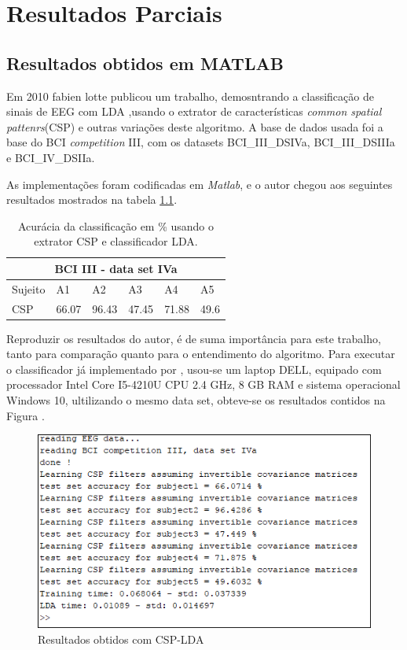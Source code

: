 \chapter[Resultados Parcias ]{Resultados Parciais}

\section{Resultados obtidos em MATLAB}
Em 2010 fabien lotte publicou um trabalho, demosntrando a classificação de sinais de EEG com LDA \cite{F.Lotte},usando o extrator de características \textit{common spatial pattenrs}(CSP) e outras
variações deste algoritmo. A base de dados usada foi a base do BCI \textit{competition} III, com os datasets BCI\_III\_DSIVa, BCI\_III\_DSIIIa e BCI\_IV\_DSIIa. 

As implementações foram codificadas em \textit{Matlab}, e o autor chegou aos seguintes resultados mostrados na tabela \ref{resultlotte}.

\begin{table}[h]
\centering
\caption{Acurácia da classificação em \% usando o extrator CSP e classificador LDA.}
\label{resultlotte}
\begin{tabular}{|l|l|l|l|l|l|}
\hline
\multicolumn{6}{|c|}{BCI III -  data set IVa}  \\ \hline
Sujeito & A1    & A2    & A3    & A4    & A5   \\ \hline
CSP     & 66.07 & 96.43 & 47.45 & 71.88 & 49.6 \\ \hline
\end{tabular}
\end{table}
 
Reproduzir os resultados do autor, é de suma importância para este trabalho, tanto para comparação quanto para o entendimento do algoritmo. Para executar o classificador já implementado por \cite{F.Lotte}, usou-se um laptop DELL, equipado com processador Intel Core I5-4210U CPU 2.4 GHz, 8 GB RAM e sistema operacional Windows 10,  ultilizando o mesmo data set, obteve-se os resultados contidos na Figura . 

\begin{figure}[h]
	\centering
	\includegraphics[keepaspectratio=true,scale=0.75]{figuras/resultados_csp_lda.PNG}
	\caption{Resultados obtidos  com CSP-LDA}
	\label{resultadoLotte}
\end{figure}

